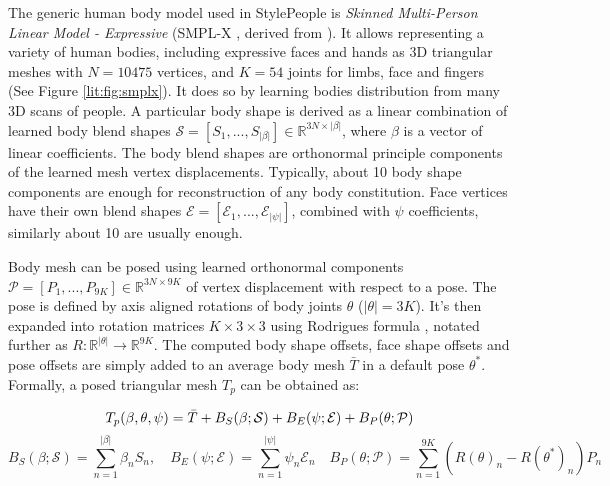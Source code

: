 The generic human body model used in StylePeople is \textit{Skinned Multi-Person Linear Model - Expressive} (SMPL-X \cite{dnn:smplx19}, derived from \cite{dnn:smpl15, dnn:smplify16}). It allows representing a variety of human bodies, including expressive faces and hands as 3D triangular meshes with $N = 10475$ vertices, and $K = 54$ joints for limbs, face and fingers (See Figure \ref{lit:fig:smplx}). It does so by learning bodies distribution from many 3D scans of people. A particular body shape is derived as a linear combination of learned body blend shapes $\mathcal{S}=[S_1, ..., S_{\lvert \beta \rvert}] \in \mathbb{R}^{3 N \times \lvert \beta \rvert}$, where $\beta$ is a vector of linear coefficients. The body blend shapes are orthonormal principle components of the learned mesh vertex displacements. Typically, about 10 body shape components are enough for reconstruction of any body constitution. Face vertices have their own blend shapes $\mathcal{E}=[\mathcal{E}_1, ..., \mathcal{E}_{\lvert \psi \rvert}]$, combined with $\psi$ coefficients, similarly about 10 are usually enough.

Body mesh can be posed using learned orthonormal components $\mathcal{P}=[P_1, ..., P_{9K}] \in \mathbb{R}^{3 N \times 9 K}$ of vertex displacement with respect to a pose. The pose is defined by axis aligned rotations of body joints $\theta$ ($\lvert \theta \rvert = 3 K$). It's then expanded into rotation matrices $K \times 3 \times 3$ using Rodrigues formula \cite{aux:rodrigues11}, notated further as $R : \mathbb{R}^{\lvert \theta \rvert} \rightarrow \mathbb{R}^{9 K}$. The computed body shape offsets, face shape offsets and pose offsets are simply added to an average body mesh $\bar{T}$ in a default pose $\theta^{*}$. Formally, a posed triangular mesh $T_p$ can be obtained as:

\setlength\abovedisplayskip{0pt}
\noindent
\begin{equation}
	\setlength\abovedisplayskip{0pt} T_p(\beta, \theta, \psi) = \bar{T} + B_S(\beta; \mathcal{S}) + B_E(\psi; \mathcal{E}) + B_P(\theta; \mathcal{P})
\end{equation}
\begin{equation}
	B_S(\beta; \mathcal{S}) = \sum_{n=1}^{\lvert \beta \rvert}\beta_n S_n, 
	\quad
	B_E(\psi; \mathcal{E}) = \sum_{n=1}^{\lvert \psi \rvert}\psi_n \mathcal{E}_n
	\quad
	B_P(\theta; \mathcal{P}) = \sum_{n=1}^{9K} \left( R(\theta)_n - R(\theta^{*})_n \right) P_n
\end{equation}
\setlength\belowdisplayskip{0pt} 

